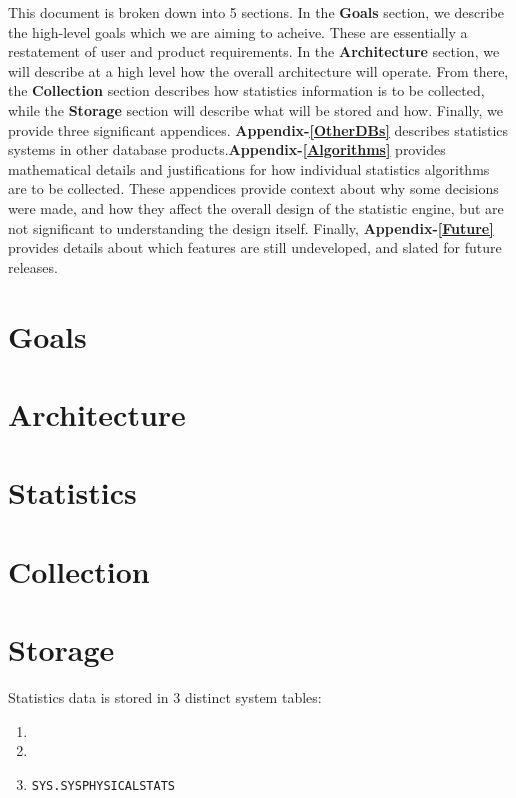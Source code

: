 This document is broken down into 5 sections. In the \textbf{Goals} section, we describe the high-level goals which we are aiming to acheive. These are essentially a restatement of user and product requirements. In the \textbf{Architecture} section, we will describe at a high level how the overall architecture will operate. From there, the \textbf{Collection} section describes how statistics information is to be collected, while the \textbf{Storage} section will describe what will be stored and how. Finally, we provide three significant appendices. \textbf{Appendix-\ref{OtherDBs}} describes statistics systems in other database products.\textbf{Appendix-\ref{Algorithms}} provides mathematical details and justifications for how individual statistics algorithms are to be collected. These appendices provide context about why some decisions were made, and how they affect the overall design of the statistic engine, but are not significant to understanding the design itself.  Finally, \textbf{Appendix-\ref{Future}} provides details about which features are still undeveloped, and slated for future releases. 

\section{Goals}


\section{Architecture}


\section{Statistics}
\label{sec:Statistics}


\section{Collection}

\section{Storage}
Statistics data is stored in 3 distinct system tables:
\begin{enumerate}
\item \systablestats
\item \syscolumnstats
\item \texttt{SYS.SYSPHYSICALSTATS}
\end{enumerate}

